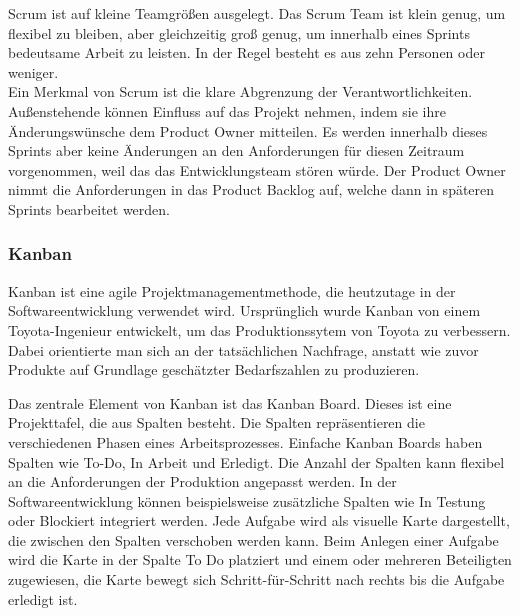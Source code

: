 \documentclass[ngerman]{seminarvorlage}
\begin{document}
Scrum ist auf kleine Teamgrößen ausgelegt. Das Scrum Team ist klein genug, um flexibel zu bleiben, aber gleichzeitig groß genug, um innerhalb eines Sprints bedeutsame Arbeit zu leisten. In der Regel besteht es aus zehn Personen oder weniger.\cite{Mucke.2024}\\
Ein Merkmal von Scrum ist die klare Abgrenzung der Verantwortlichkeiten. Außenstehende können Einfluss auf das Projekt nehmen, indem sie ihre Änderungswünsche dem Product Owner mitteilen. Es werden innerhalb dieses Sprints aber keine Änderungen an den Anforderungen für diesen Zeitraum vorgenommen, weil das das Entwicklungsteam stören würde. Der Product Owner nimmt die Anforderungen in das Product Backlog auf, welche dann in späteren Sprints bearbeitet werden.\cite{Gluck.2022}

\subsubsection{Kanban}
Kanban ist eine agile Projektmanagementmethode, die heutzutage in der Softwareentwicklung verwendet wird. Ursprünglich wurde Kanban von einem Toyota-Ingenieur entwickelt, um das Produktionssytem von Toyota zu verbessern. Dabei orientierte man sich an der tatsächlichen Nachfrage, anstatt wie zuvor Produkte auf Grundlage geschätzter Bedarfszahlen zu produzieren.\cite{Simschek.2022}

Das zentrale Element von Kanban ist das Kanban Board. Dieses ist eine Projekttafel, die aus Spalten besteht. Die Spalten repräsentieren die verschiedenen Phasen eines Arbeitsprozesses. Einfache Kanban Boards haben Spalten wie \glqq To-Do\grqq , \glqq In Arbeit\grqq\: und \glqq Erledigt\grqq . Die Anzahl der Spalten kann flexibel an die Anforderungen der Produktion angepasst werden.  In der Softwareentwicklung können beispielsweise zusätzliche Spalten wie \glqq In Testung\grqq\: oder \glqq Blockiert\grqq\: integriert werden. Jede Aufgabe wird als visuelle Karte dargestellt, die zwischen den Spalten verschoben werden kann. Beim Anlegen einer Aufgabe wird die Karte in der Spalte \glqq To Do\grqq\: platziert und einem oder mehreren Beteiligten zugewiesen, die Karte bewegt sich Schritt-für-Schritt nach rechts bis die Aufgabe erledigt ist.\cite{Asana.2024}
\end{document}
